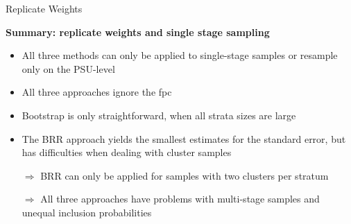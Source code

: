 \documentclass[11pt,german,hideothersubsections]{beamer}\usepackage[]{graphicx}\usepackage[]{color}
\begin{document}
\begin{frame}[fragile]{Replicate Weights}
\footnotesize{
\begin{center}
\textbf{Summary: replicate weights and single stage sampling}
\end{center}
\begin{itemize}
\item All three methods can only be applied to single-stage samples or resample only on the PSU-level
\item All three approaches ignore the fpc
\pause\item Bootstrap is only straightforward, when all strata sizes are large
\pause\item The BRR approach yields the smallest estimates for the standard error, but has difficulties when dealing with cluster samples
\pause\item[$\Rightarrow$] BRR can only be applied for samples with two clusters per stratum
\pause\item[$\Rightarrow$] All three approaches have problems with multi-stage samples and unequal inclusion probabilities 

\end{itemize}
}
\end{frame}
\end{document}
